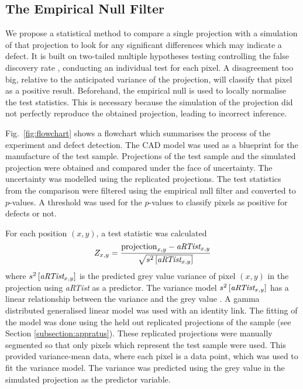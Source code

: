 \documentclass{article}
\begin{document}
\subsection{The Empirical Null Filter}
\label{subsection:empiricalnullfilter}

We propose a statistical method to compare a single projection with a simulation of that projection to look for any significant differences which may indicate a defect. It is built on two-tailed multiple hypotheses testing \citep{fisher1970statistical, neyman1933on, pearson1900on} controlling the false discovery rate \citep{benjamini2010discovering, benjamini1995controlling}, conducting an individual test for each pixel. A disagreement too big, relative to the anticipated variance of the projection, will classify that pixel as a positive result. Beforehand, the empirical null \citep{efron2004large} is used to locally normalise \citep{sage2018local, sage2003teaching} the test statistics. This is necessary because the simulation of the projection did not perfectly reproduce the obtained projection, leading to incorrect inference.

Fig.~\ref{fig:flowchart} shows a flowchart which summarises the process of the experiment and defect detection. The CAD model was used as a blueprint for the manufacture of the test sample. Projections of the test sample and the simulated projection were obtained and compared under the face of uncertainty. The uncertainty was modelled using the replicated projections. The test statistics from the comparison were filtered using the empirical null filter and converted to $p$-values. A threshold was used for the $p$-values to classify pixels as positive for defects or not.

For each position $(x,y)$, a test statistic was calculated
\begin{equation}
  Z_{x,y} =
  \dfrac{
    \text{projection}_{x,y} - \emph{aRTist}_{x,y}
  }
  {
    \sqrt{{s}^2\left[\emph{aRTist}_{x,y}\right]}
  }
\end{equation}
where ${s}^2\left[\emph{aRTist}_{x,y}\right]$ is the predicted grey value variance of pixel $(x,y)$ in the projection using \emph{aRTist} as a predictor. The variance model ${s}^2\left[\emph{aRTist}_{x,y}\right]$ has a linear relationship between the variance and the grey value \citep{ma2012varaince, yang2010noise}. A gamma distributed generalised linear model \citep{mccullagh1984generalized, nelder1972generalized} was used with an identity link. The fitting of the model was done using the held out replicated projections of the sample (see Section \ref{subsection:appratus}). These replicated projections were manually segmented so that only pixels which represent the test sample were used. This provided variance-mean data, where each pixel is a data point, which was used to fit the variance model. The variance was predicted using the grey value in the simulated projection as the predictor variable.
\end{document}

